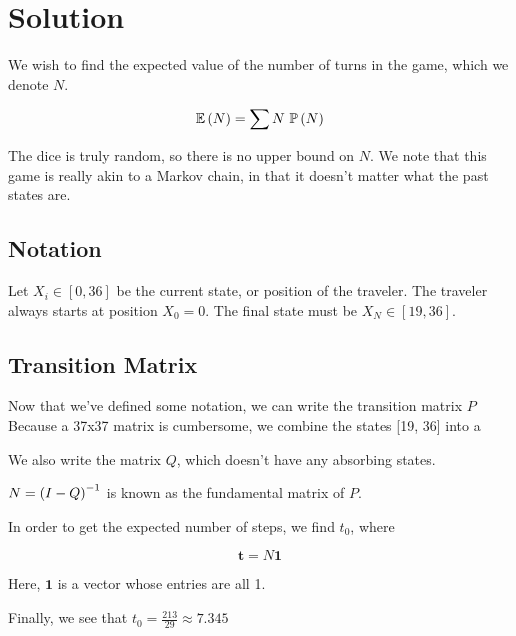 \documentclass[11pt]{article}
\begin{document}
\section{Solution}
We wish to find the expected value of the number of turns in the game, which we denote $N$.

\[
    \mathbb E \left ( N \right) = \sum N\ \mathbb P \left ( N \right)
\]

The dice is truly random, so there is no upper bound on $N$.
We note that this game is really akin to a Markov chain, in that it doesn't matter what the past states are.


\subsection{Notation}
Let $X_i \in [0, 36]$ be the current state, or position of the traveler.
The traveler always starts at position $X_0=0$.
The final state must be $X_N \in [19, 36]$.

\subsection{Transition Matrix}
Now that we've defined some notation, we can write the transition matrix $P$
Because a 37x37 matrix is cumbersome, we combine the states [19, 36] into a 



We also write the matrix $Q$, which doesn't have any absorbing states.



$N = \left ( I - Q \right)^{-1}$ is known as the fundamental matrix of $P$.





In order to get the expected number of steps, we find $t_0$, where

$$
\bm{t} = N \bm{1}
$$

Here, $\bm{1}$ is a vector whose entries are all 1.



Finally, we see that $t_0 = \boxed{\frac{213}{29} \approx 7.345}$
\end{document}

